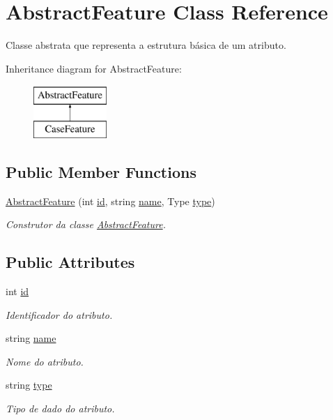 \hypertarget{class_abstract_feature}{}\section{Abstract\+Feature Class Reference}
\label{class_abstract_feature}


Classe abstrata que representa a estrutura básica de um atributo.  


Inheritance diagram for Abstract\+Feature\+:\begin{figure}[H]
\begin{center}
\leavevmode
\includegraphics[height=2.000000cm]{class_abstract_feature}
\end{center}
\end{figure}
\subsection*{Public Member Functions}
\begin{DoxyCompactItemize}
\item 
\hyperlink{class_abstract_feature_acc855b1f84c6671d1fdb922a831ed170}{Abstract\+Feature} (int \hyperlink{class_abstract_feature_a3ac6f31b3e7a83ce4f73fab9f0139b7f}{id}, string \hyperlink{class_abstract_feature_a48465ede21b778021ea03b56d2117bc8}{name}, Type \hyperlink{class_abstract_feature_ac65cf0de277a8a62b6b1e1bdc249b237}{type})
\begin{DoxyCompactList}\small\item\em Construtor da classe \hyperlink{class_abstract_feature}{Abstract\+Feature}. \end{DoxyCompactList}\end{DoxyCompactItemize}
\subsection*{Public Attributes}
\begin{DoxyCompactItemize}
\item 
int \hyperlink{class_abstract_feature_a3ac6f31b3e7a83ce4f73fab9f0139b7f}{id}
\begin{DoxyCompactList}\small\item\em Identificador do atributo. \end{DoxyCompactList}\item 
string \hyperlink{class_abstract_feature_a48465ede21b778021ea03b56d2117bc8}{name}
\begin{DoxyCompactList}\small\item\em Nome do atributo. \end{DoxyCompactList}\item 
string \hyperlink{class_abstract_feature_ac65cf0de277a8a62b6b1e1bdc249b237}{type}
\begin{DoxyCompactList}\small\item\em Tipo de dado do atributo. \end{DoxyCompactList}\end{DoxyCompactItemize}



